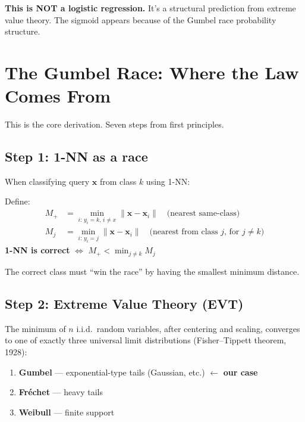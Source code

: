 \documentclass[11pt,a4paper]{article}
\begin{document}
\textbf{This is NOT a logistic regression.} It's a structural prediction from extreme value theory. The sigmoid appears because of the Gumbel race probability structure.

\section{The Gumbel Race: Where the Law Comes From}

This is the core derivation. Seven steps from first principles.

\subsection{Step 1: 1-NN as a race}

When classifying query $\mathbf{x}$ from class $k$ using 1-NN:

\begin{derivbox}
Define:
\begin{align}
M_+ &= \min_{i:\,y_i=k,\,i\neq x} \|\mathbf{x} - \mathbf{x}_i\| \quad \text{(nearest same-class)} \\
M_j &= \min_{i:\,y_i=j} \|\mathbf{x} - \mathbf{x}_i\| \quad \text{(nearest from class $j$, for $j\neq k$)}
\end{align}
\textbf{1-NN is correct} $\iff$ $M_+ < \min_{j \neq k} M_j$

The correct class must ``win the race'' by having the smallest minimum distance.
\end{derivbox}

\subsection{Step 2: Extreme Value Theory (EVT)}

The minimum of $n$ i.i.d.\ random variables, after centering and scaling, converges to one of exactly three universal limit distributions (Fisher--Tippett theorem, 1928):

\begin{enumerate}[nosep]
\item \textbf{Gumbel} --- exponential-type tails (Gaussian, etc.) $\leftarrow$ \textbf{our case}
\item \textbf{Fr\'echet} --- heavy tails
\item \textbf{Weibull} --- finite support
\end{enumerate}
\end{document}
